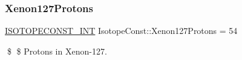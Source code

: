 \subsubsection{\texorpdfstring{Xenon127\+Protons}{Xenon127Protons}}
{\footnotesize\ttfamily \mbox{\hyperlink{group___isotope_const-_macros_ga5f18360b3e99483a35c32d789e62621c}{I\+S\+O\+T\+O\+P\+E\+C\+O\+N\+S\+T\+\_\+\+I\+NT}} Isotope\+Const\+::\+Xenon127\+Protons = 54}

\$ \$ Protons in Xenon-\/127. 